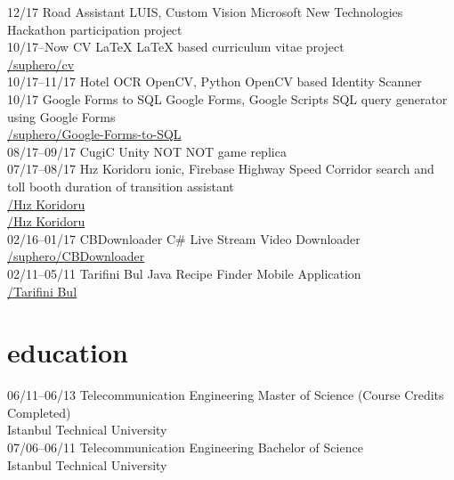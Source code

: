 \documentclass[]{../friggeri-cv} %
\begin{document}
\begin{entrylist}
\entry
{12/17}
{Road Assistant}
{LUIS, Custom Vision}
{Microsoft New Technologies Hackathon participation project}
\\
\entry
{10/17--Now}
{CV}
{\LaTeX}
{LaTeX based curriculum vitae project
\\\href{https://github.com/suphero/cv}{\faGithub/suphero/cv}}
\\
\entry
{10/17--11/17}
{Hotel OCR}
{OpenCV, Python}
{OpenCV based Identity Scanner}
\\
\entry
{10/17}
{Google Forms to SQL}
{Google Forms, Google Scripts}
{SQL query generator using Google Forms
\\\href{https://github.com/suphero/Google-Forms-to-SQL}{\faGithub/suphero/Google-Forms-to-SQL}}
\\
\entry
{08/17--09/17}
{CugiC}
{Unity}
{NOT NOT game replica}
\\
\entry
{07/17--08/17}
{Hız Koridoru}
{ionic, Firebase}
{Highway Speed Corridor search and toll booth duration of transition assistant
\\\href{https://play.google.com/store/apps/details?id=com.harunsokullu.speedcorridor}{\faAndroid/Hız Koridoru}
\\\href{https://itunes.apple.com/tr/app/h\%C4\%B1z-koridoru/id1265151812}{\faApple/Hız Koridoru}}
\\
\entry
{02/16--01/17}
{CBDownloader}
{C\#}
{Live Stream Video Downloader
\\\href{https://github.com/suphero/CBDownloader}{\faGithub/suphero/CBDownloader}}
\\
\entry
{02/11--05/11}
{Tarifini Bul}
{Java}
{Recipe Finder Mobile Application
\\\href{https://play.google.com/store/apps/details?id=com.tarifinibul}{\faAndroid/Tarifini Bul}}

\end{entrylist}

\section{education}

\begin{entrylist}

\entry
{06/11--06/13}
{Telecommunication Engineering}{}
{Master of Science (Course Credits Completed)
\\Istanbul Technical University}
\\
\entry
{07/06--06/11}
{Telecommunication Engineering}{}
{Bachelor of Science
\\Istanbul Technical University}
	
\end{entrylist}
\end{document}
